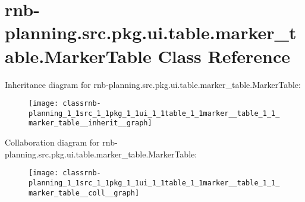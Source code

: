 \hypertarget{classrnb-planning_1_1src_1_1pkg_1_1ui_1_1table_1_1marker__table_1_1_marker_table}{}\section{rnb-\/planning.src.\+pkg.\+ui.\+table.\+marker\+\_\+table.\+Marker\+Table Class Reference}
\label{classrnb-planning_1_1src_1_1pkg_1_1ui_1_1table_1_1marker__table_1_1_marker_table}


Inheritance diagram for rnb-\/planning.src.\+pkg.\+ui.\+table.\+marker\+\_\+table.\+Marker\+Table\+:\nopagebreak
\begin{figure}[H]
\begin{center}
\leavevmode
\texttt{[image: classrnb-planning\_1\_1src\_1\_1pkg\_1\_1ui\_1\_1table\_1\_1marker\_\_table\_1\_1\_marker\_table\_\_inherit\_\_graph]}
\end{center}
\end{figure}


Collaboration diagram for rnb-\/planning.src.\+pkg.\+ui.\+table.\+marker\+\_\+table.\+Marker\+Table\+:\nopagebreak
\begin{figure}[H]
\begin{center}
\leavevmode
\texttt{[image: classrnb-planning\_1\_1src\_1\_1pkg\_1\_1ui\_1\_1table\_1\_1marker\_\_table\_1\_1\_marker\_table\_\_coll\_\_graph]}
\end{center}
\end{figure}
